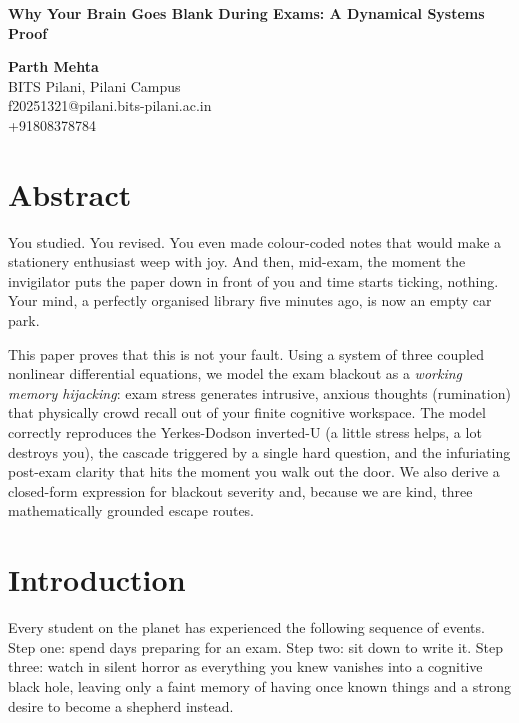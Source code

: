 \documentclass[11pt,a4paper]{article}
\begin{document}
\begin{center}

{\fontsize{13}{15}\selectfont\textbf{%
Why Your Brain Goes Blank During Exams: A Dynamical Systems Proof}}

\vspace{10pt}

{\fontsize{13}{15}\selectfont\textbf{Parth Mehta}}\\[2pt]
{\fontsize{11}{13}\selectfont BITS Pilani, Pilani Campus}\\[2pt]
{\fontsize{11}{13}\selectfont f20251321@pilani.bits-pilani.ac.in}\\[2pt]
{\fontsize{11}{13}\selectfont +91808378784}\\[2pt]
\end{center}

\vspace{12pt}

\section*{Abstract}

You studied. You revised. You even made colour-coded notes that would
make a stationery enthusiast weep with joy. And then, mid-exam, the
moment the invigilator puts the paper down in front of you and time
starts ticking, nothing. Your mind, a perfectly organised library five
minutes ago, is now an empty car park.

This paper proves that this is not your fault. Using a system of three
coupled nonlinear differential equations, we model the exam blackout as
a \emph{working memory hijacking}: exam stress generates intrusive,
anxious thoughts (rumination) that physically crowd recall out of your
finite cognitive workspace. The model correctly reproduces the
Yerkes-Dodson inverted-U (a little stress helps, a lot destroys you),
the cascade triggered by a single hard question, and the infuriating
post-exam clarity that hits the moment you walk out the door. We also
derive a closed-form expression for blackout severity and, because we
are kind, three mathematically grounded escape routes.

\vspace{12pt}

\section{Introduction}

Every student on the planet has experienced the following sequence of
events. Step one: spend days preparing for an exam. Step two: sit down
to write it. Step three: watch in silent horror as everything you knew
vanishes into a cognitive black hole, leaving only a faint memory of
having once known things and a strong desire to become a shepherd
instead.
\end{document}
